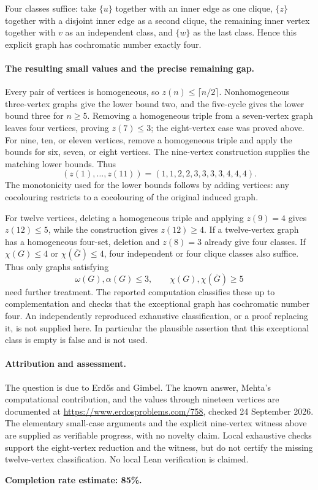 Four classes suffice: take \(\{u\}\) together with an inner edge as one clique, \(\{z\}\) together with a disjoint inner edge as a second clique, the remaining inner vertex together with \(v\) as an independent class, and \(\{w\}\) as the last class. Hence this explicit graph has cochromatic number exactly four.

\paragraph{The resulting small values and the precise remaining gap.}
Every pair of vertices is homogeneous, so \(z(n)\leq\lceil n/2\rceil\). Nonhomogeneous three-vertex graphs give the lower bound two, and the five-cycle gives the lower bound three for \(n\geq5\). Removing a homogeneous triple from a seven-vertex graph leaves four vertices, proving \(z(7)\leq3\); the eight-vertex case was proved above. For nine, ten, or eleven vertices, remove a homogeneous triple and apply the bounds for six, seven, or eight vertices. The nine-vertex construction supplies the matching lower bounds. Thus
\[
 (z(1),\ldots,z(11))=(1,1,2,2,3,3,3,3,4,4,4).
\]
The monotonicity used for the lower bounds follows by adding vertices: any cocolouring restricts to a cocolouring of the original induced graph.

For twelve vertices, deleting a homogeneous triple and applying \(z(9)=4\) gives \(z(12)\leq5\), while the construction gives \(z(12)\geq4\). If a twelve-vertex graph has a homogeneous four-set, deletion and \(z(8)=3\) already give four classes. If \(\chi(G)\leq4\) or \(\chi(\overline G)\leq4\), four independent or four clique classes also suffice. Thus only graphs satisfying
\[
 \omega(G),\alpha(G)\leq3,\qquad
 \chi(G),\chi(\overline G)\geq5
\]
need further treatment. The reported computation classifies these up to complementation and checks that the exceptional graph has cochromatic number four. An independently reproduced exhaustive classification, or a proof replacing it, is not supplied here. In particular the plausible assertion that this exceptional class is empty is false and is not used.

\paragraph{Attribution and assessment.}
The question is due to Erd\H{o}s and Gimbel. The known answer, Mehta's computational contribution, and the values through nineteen vertices are documented at \url{https://www.erdosproblems.com/758}, checked 24 September 2026. The elementary small-case arguments and the explicit nine-vertex witness above are supplied as verifiable progress, with no novelty claim. Local exhaustive checks support the eight-vertex reduction and the witness, but do not certify the missing twelve-vertex classification. No local Lean verification is claimed.

\textbf{Completion rate estimate: 85\%.}
